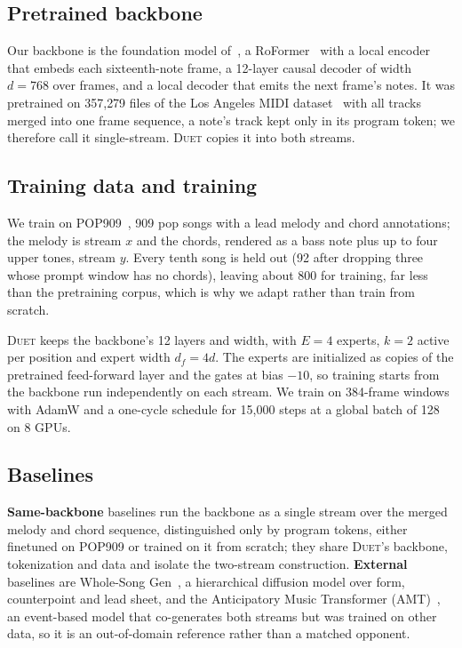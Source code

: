 \documentclass{article}
\newcommand{\sys}{\textsc{Duet}\xspace}
\begin{document}
\subsection{Pretrained backbone}
\label{sec:backbone_training}

Our backbone is the foundation model of~\cite{yinyang}, a
RoFormer~\cite{roformer} with a local encoder that embeds each
sixteenth-note frame, a 12-layer causal decoder of width $d=768$ over
frames, and a local decoder that emits the next frame's notes. It was
pretrained on 357{,}279 files of the Los Angeles MIDI
dataset~\cite{lamd} with all tracks merged into one frame sequence, a
note's track kept only in its program token; we therefore call it
single-stream. \sys copies it into both streams.

\subsection{Training data and training}
\label{sec:data}

We train on POP909~\cite{pop909}, 909 pop songs with a lead melody and
chord annotations; the melody is stream $x$ and the chords, rendered as
a bass note plus up to four upper tones, stream $y$. Every tenth song
is held out (92 after dropping three whose prompt window has no
chords), leaving about 800 for training, far less than the pretraining
corpus, which is why we adapt rather than train from scratch.

\sys keeps the backbone's 12 layers and width, with $E=4$ experts,
$k=2$ active per position and expert width $d_f=4d$. The experts are
initialized as copies of the pretrained feed-forward layer and the
gates at bias $-10$, so training starts from the backbone run
independently on each stream. We train on 384-frame windows with AdamW
and a one-cycle schedule for 15{,}000 steps at a global batch of 128
on 8 GPUs.

\subsection{Baselines}
\label{sec:baselines}

\textbf{Same-backbone} baselines run the backbone as a single stream
over the merged melody and chord sequence, distinguished only by
program tokens, either finetuned on POP909 or trained on it from
scratch; they share \sys's backbone, tokenization and data and isolate
the two-stream construction. \textbf{External} baselines are
Whole-Song Gen~\cite{whole_song}, a hierarchical diffusion model over
form, counterpoint and lead sheet, and the Anticipatory Music
Transformer (AMT)~\cite{anticipatory}, an event-based model that
co-generates both streams but was trained on other data, so it is an
out-of-domain reference rather than a matched opponent.
\end{document}
